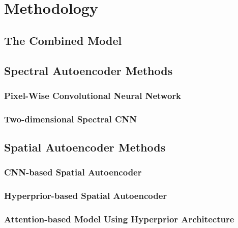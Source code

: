 \chapter{Methodology\label{cha:chapter4}}

\section{The Combined Model}

\section{Spectral Autoencoder Methods}

\subsection{Pixel-Wise Convolutional Neural Network\label{sec:ch3xxx}}

\subsection{Two-dimensional Spectral CNN\label{sec:ch3yyy}}

\section{Spatial Autoencoder Methods\label{sec:ch3zzz}}

\subsection{CNN-based Spatial Autoencoder}

\subsection{Hyperprior-based Spatial Autoencoder}

\subsection{Attention-based Model Using Hyperprior Architecture}

